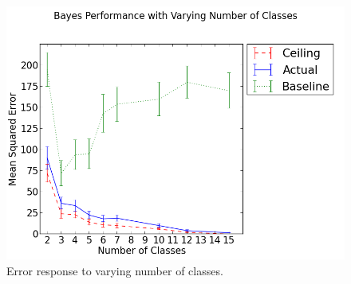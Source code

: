 \documentclass[12pt,notitlepage,twoside]{scrreprt}
\begin{document}
\begin{figure}[h!]
  \includegraphics[width=\linewidth]{figs/quants.png}
  \caption{Error response to varying number of classes.\label{quants}}
\end{figure}
\end{document}
